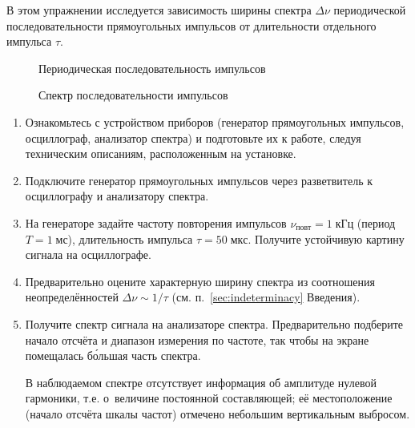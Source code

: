 \begin{lab:task}


В этом упражнении исследуется зависимость ширины спектра $\Delta \nu$
периодической последовательности прямоугольных импульсов
от длительности отдельного импульса $\tau$.

\begin{figure}[h!]
\hfil\hfil
\begin{minipage}{0.4\textwidth}
    \caption{Периодическая последовательность импульсов}
\end{minipage}
\hfil
\begin{minipage}{0.4\textwidth}
    \caption{Спектр последовательности импульсов}
\end{minipage}
\end{figure}

\begin{enumerate}

\item Ознакомьтесь с устройством приборов (генератор прямоугольных импульсов,
осциллограф, анализатор спектра) и подготовьте их к работе,
следуя техническим описаниям, расположенным на установке.

\item Подключите генератор прямоугольных импульсов через разветвитель
к осциллографу и анализатору спектра.

\item На генераторе задайте частоту повторения импульсов
$\nu_{повт} = 1\;кГц$ (период $T=1\;мс$), длительность импульса
$\tau=50\;мкс$. Получите устойчивую картину сигнала на осциллографе.

\item Предварительно оцените характерную ширину спектра
из соотношения неопределённостей $\Delta \nu \sim 1/\tau$
(см.  п.~\ref{sec:indeterminacy} Введения).

\item Получите спектр сигнала на анализаторе спектра. Предварительно
подберите начало отсчёта и диапазон измерения по частоте,
так чтобы на экране помещалась б\'{о}льшая часть спектра.

В наблюдаемом спектре отсутствует информация об амплитуде нулевой гармоники,
т.е. о~величине постоянной составляющей; её местоположение (начало отсчёта шкалы
частот) отмечено небольшим вертикальным выбросом.


\end{enumerate}
\end{lab:task}

